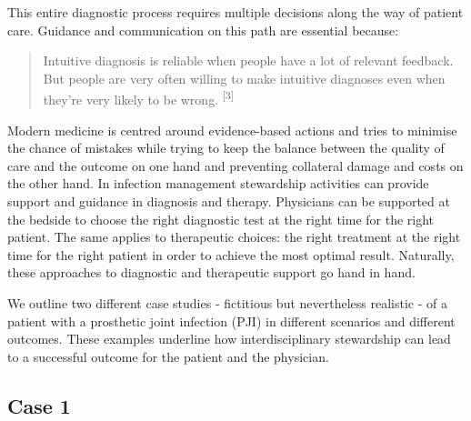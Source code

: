 \documentclass[
]{book}
\begin{document}
This entire diagnostic process requires multiple decisions along the way of patient care. Guidance and communication on this path are essential because:

\begin{quote}
Intuitive diagnosis is reliable when people have a lot of relevant feedback. But people are very often willing to make intuitive diagnoses even when they're very likely to be wrong. \textsuperscript{{[}3{]}}
\end{quote}

Modern medicine is centred around evidence-based actions and tries to minimise the chance of mistakes while trying to keep the balance between the quality of care and the outcome on one hand and preventing collateral damage and costs on the other hand. In infection management stewardship activities can provide support and guidance in diagnosis and therapy. Physicians can be supported at the bedside to choose the right diagnostic test at the right time for the right patient. The same applies to therapeutic choices: the right treatment at the right time for the right patient in order to achieve the most optimal result. Naturally, these approaches to diagnostic and therapeutic support go hand in hand.

We outline two different case studies - fictitious but nevertheless realistic - of a patient with a prosthetic joint infection (PJI) in different scenarios and different outcomes. These examples underline how interdisciplinary stewardship can lead to a successful outcome for the patient and the physician.

\hypertarget{case-1}{%
\subsection{Case 1}\label{case-1}}
\end{document}
